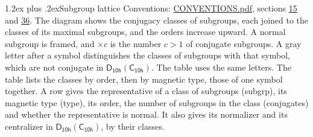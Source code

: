 \documentclass[10pt,a4paper]{article}
\makeatletter
\renewcommand\section{\@startsection{section}{1}{\z@}{-3ex plus -1ex minus -.2ex}%
  {1.2ex plus .2ex}{\normalfont\large\sffamily\bfseries\color{parttitle}}}
\numberwithin{equation}{section}
\newcommand{\grp}[1]{\mathsf{#1}}
\makeatother
\begin{document}
\section{Subgroup lattice}\label{s:subgroups}
Conventions: \href{../../CONVENTIONS.pdf}{CONVENTIONS.pdf}, sections \href{../../../rotation/CONVENTIONS.pdf\#conv.15}{15} and \href{../../CONVENTIONS.pdf\#conv.36}{36}.
The diagram shows the conjugacy classes of subgroups, each joined to the classes of its maximal subgroups, and the orders increase upward. \label{n:index.conjugates.c}\label{n:mark.conjugates}A normal subgroup is framed, and ${\times}c$ is the number $c > 1$ of conjugate subgroups. \label{n:mark.letter}A gray letter after a symbol distinguishes the classes of subgroups with that symbol, which are not conjugate in $\grp{D_{10h}}(\grp{C_{10h}})$. The table uses the same letters. The table lists the classes by order, then by magnetic type, those of one symbol together. \label{n:head.subgroup}\label{n:head.magnetic.type}\label{n:head.order}\label{n:head.conjugates}\label{n:head.normal}A row gives the representative of a class of subgroups (subgrp), its magnetic type (type), its order, the number of subgroups in the class (conjugates) and whether the representative is normal. \label{n:head.normalizer}\label{n:head.centralizer}It also gives its normalizer and its centralizer in $\grp{D_{10h}}(\grp{C_{10h}})$, by their classes. 
\end{document}
